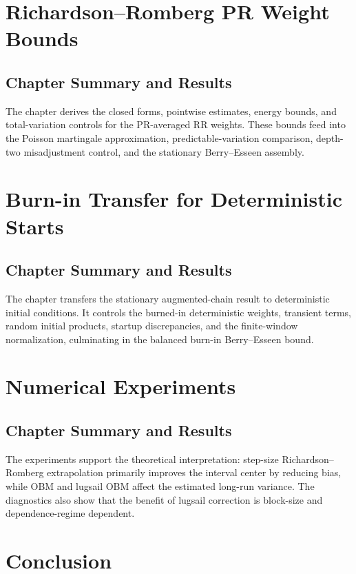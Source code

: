\documentclass[11pt,a4paper,oneside]{report}
\numberwithin{equation}{chapter}
\begin{document}
\chapter{Richardson--Romberg PR Weight Bounds}\label{sec:pr_weights}


\section{Chapter Summary and Results}
The chapter derives the closed forms, pointwise estimates, energy bounds, and
total-variation controls for the PR-averaged RR weights. These bounds feed
into the Poisson martingale approximation, predictable-variation comparison,
depth-two misadjustment control, and the stationary Berry--Esseen assembly.

\chapter{Burn-in Transfer for Deterministic Starts}
\label{sec:burn_in_transfer}


\section{Chapter Summary and Results}
The chapter transfers the stationary augmented-chain result to deterministic
initial conditions. It controls the burned-in deterministic weights,
transient terms, random initial products, startup discrepancies, and the
finite-window normalization, culminating in the balanced burn-in
Berry--Esseen bound.

\chapter{Numerical Experiments}\label{sec:experiments}


\section{Chapter Summary and Results}
The experiments support the theoretical interpretation: step-size
Richardson--Romberg extrapolation primarily improves the interval center by
reducing bias, while OBM and lugsail OBM affect the estimated long-run
variance. The diagnostics also show that the benefit of lugsail correction is
block-size and dependence-regime dependent.

\chapter{Conclusion}\label{sec:conclusion}

\end{document}
